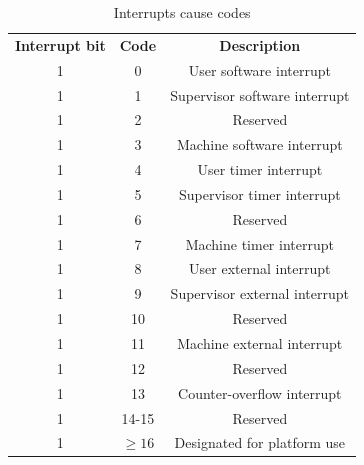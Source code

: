 \begin{table}
  \centering
  \small
  \begin{tabular}{|c|c|c|}
    \hline
    \textbf{Interrupt bit} & \textbf{Code} & \textbf{Description}          \\
    \hhline{===} 1         & 0             & User software interrupt       \\
    \hline
    1                      & 1             & Supervisor software interrupt \\
    \hline
    1                      & 2             & Reserved                      \\
    \hline
    1                      & 3             & Machine software interrupt    \\
    \hline
    1                      & 4             & User timer interrupt          \\
    \hline
    1                      & 5             & Supervisor timer interrupt    \\
    \hline
    1                      & 6             & Reserved                      \\
    \hline
    1                      & 7             & Machine timer interrupt       \\
    \hline
    1                      & 8             & User external interrupt       \\
    \hline
    1                      & 9             & Supervisor external interrupt \\
    \hline
    1                      & 10            & Reserved                      \\
    \hline
    1                      & 11            & Machine external interrupt    \\
    \hline
    1                      & 12            & Reserved                      \\
    \hline
    1                      & 13            & Counter-overflow interrupt    \\
    \hline
    1                      & 14-15         & Reserved                      \\
    \hline
    1                      & $\geq 16$     & Designated for platform use   \\
    \hline
  \end{tabular}
  \caption{Interrupts cause codes}
  \label{tab:interruptcauses}
\end{table}

